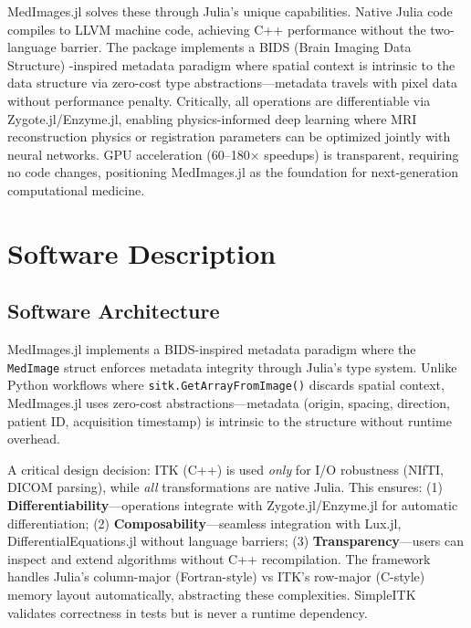 \documentclass[a4paper,10pt]{elsarticle}
\begin{document}
  MedImages.jl solves these through Julia's \cite{BezansonChen2018} unique capabilities. Native Julia code compiles to LLVM machine code, achieving C++ performance without the two-language barrier. The package implements a BIDS (Brain Imaging Data Structure)
  -inspired metadata paradigm where spatial context is intrinsic to the data structure via zero-cost type abstractions—metadata travels with pixel data without performance penalty. Critically, all operations are differentiable via
  Zygote.jl/Enzyme.jl, enabling physics-informed deep learning where MRI reconstruction physics or registration parameters can be optimized jointly with neural networks. GPU acceleration (60--180× speedups) is transparent, requiring no
  code changes, positioning MedImages.jl as the foundation for next-generation computational medicine.

  \section{Software Description}

  \subsection{Software Architecture}
  MedImages.jl implements a BIDS-inspired metadata paradigm where the \texttt{MedImage} struct enforces metadata integrity through Julia's type system. Unlike Python workflows \cite{CardosoLi2022, KaliyugarasanLundervold2023, KimKazmierski2025} where \texttt{sitk.GetArrayFromImage()} discards spatial
  context, MedImages.jl uses zero-cost abstractions—metadata (origin, spacing, direction, patient ID, acquisition timestamp) is intrinsic to the structure without runtime overhead.

  A critical design decision: ITK (C++) is used \textit{only} for I/O robustness (NIfTI, DICOM parsing), while \textit{all} transformations are native Julia. This ensures: (1) \textbf{Differentiability}—operations integrate with
  Zygote.jl/Enzyme.jl for automatic differentiation; (2) \textbf{Composability}—seamless integration with Lux.jl, DifferentialEquations.jl without language barriers; (3) \textbf{Transparency}—users can inspect and extend algorithms
  without C++ recompilation. The framework handles Julia's column-major (Fortran-style) vs ITK's row-major (C-style) memory layout automatically, abstracting these complexities. SimpleITK \cite{LowekampChen2013} validates correctness in tests but is never a
  runtime dependency.
\end{document}

